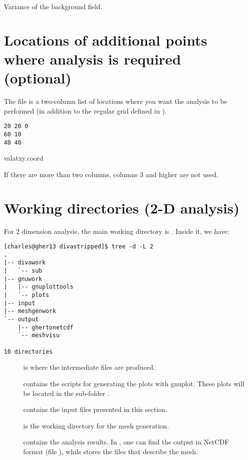 Variance of the background field. 


\section[Additional points of analysis]{Locations of additional points where analysis is required (optional)}

The file  is a two-column list of locations where you want the analysis to be performed (in addition to the regular grid defined in ).  

\begin{exfile}[htpb]
\begin{footnotesize}
\texttt{20 20 0\\
60 10\\
40 40} 
\end{footnotesize}
\caption{valatxy.coord\label{ex:valatxy}}
\end{exfile}

If there are more than two columns, columns 3 and higher are not used.


\section{Working directories (2-D analysis)}

For 2 dimension analysis, the main working directory is . Inside it, we have:
\begin{lstlisting}[style=Bash]
[charles@gher13 divastripped]$ tree -d -L 2
.
|-- divawork
|   `-- sub
|-- gnuwork
|   |-- gnuplottools
|   `-- plots
|-- input
|-- meshgenwork
`-- output
    |-- ghertonetcdf
    `-- meshvisu

10 directories
\end{lstlisting}


\begin{description}

\item[] is where the intermediate files are produced.
\item[] contains the scripts for generating the plots with gnuplot. These plots will be located in the sub-folder .
\item[] contains the input files presented in this section.
\item[] is the working directory for the mesh generation.
\item[] contains the analysis results. In , one can find the output in NetCDF format (file ), while  stores the files that describe the mesh.
\end{description}